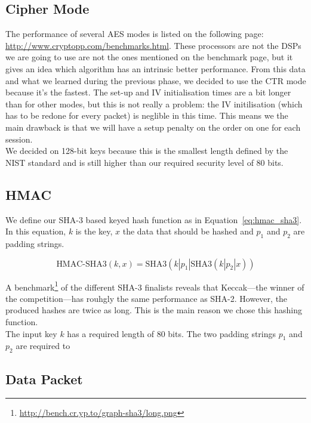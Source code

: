 \documentclass[a4paper]{article}
\begin{document}
\subsection{Cipher Mode}

The performance of several AES modes is listed on the following page: \url{http://www.cryptopp.com/benchmarks.html}. These processors are not the DSPs we are going to use are not the ones mentioned on the benchmark page, but it gives an idea which algorithm has an intrinsic better performance. From this data and what we learned during the previous phase, we decided to use the CTR mode because it's the fastest. The set-up and IV initialisation times are a bit longer than for other modes, but this is not really a problem: the IV initilisation (which has to be redone for every packet) is neglible in this time. This means we the main drawback is that we will have a setup penalty on the order on one {\micro\second} for each session.\\

We decided on 128-bit keys because this is the smallest length defined by the NIST standard and is still higher than our required security level of 80 bits.

\subsection{HMAC}

We define our SHA-3 based keyed hash function as in Equation~\ref{eq:hmac_sha3}. In this equation, $k$ is the key, $x$ the data that should be hashed and $p_1$ and $p_2$ are padding strings.

\begin{equation} \label{eq:hmac_sha3}
    \text{HMAC-SHA3}(k, x) = \text{SHA3}(k | p_1 | \text{SHA3}(k | p_2 | x))
\end{equation}

A benchmark\footnote{\url{http://bench.cr.yp.to/graph-sha3/long.png}} of the different SHA-3 finalists reveals that Keccak---the winner of the competition---has rouhgly the same performance as SHA-2. However, the produced hashes are twice as long. This is the main reason we chose this hashing function.\\

The input key $k$ has a required length of 80 bits. The two padding strings $p_1$ and $p_2$ are required to 

\subsection{Data Packet}
\end{document}
